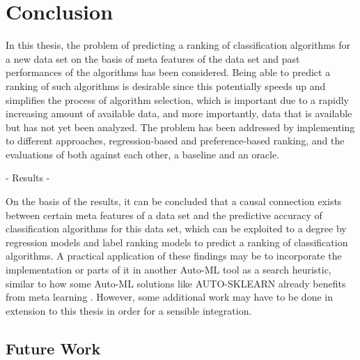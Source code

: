 \chapter{Conclusion}
\label{sec:conclusion}
In this thesis, the problem of predicting a ranking of classification algorithms for a new data set on the basis of meta features of the data set and past performances of the algorithms has been considered. Being able to predict a ranking of such algorithms is desirable since this potentially speeds up and simplifies the process of algorithm selection, which is important due to a rapidly increasing amount of available data, and more importantly, data that is available but has not yet been analyzed. The problem has been addressed by implementing to different approaches, regression-based and preference-based ranking, and the evaluations of both against each other, a baseline and an oracle.

- Results - 

On the basis of the results, it can be concluded that a causal connection exists between certain meta features of a data set and the predictive accuracy of classification algorithms for this data set, which can be exploited to a degree by regression models and label ranking models to predict a ranking of classification algorithms. A practical application of these findings may be to incorporate the implementation or parts of it in another Auto-ML tool as a search heuristic, similar to how some Auto-ML solutions like AUTO-SKLEARN already benefits from meta learning \cite{feurer2015efficient}. However, some additional work may have to be done in extension to this thesis in order for a sensible integration.

\section{Future Work}
\label{sec:conclusion:future}



